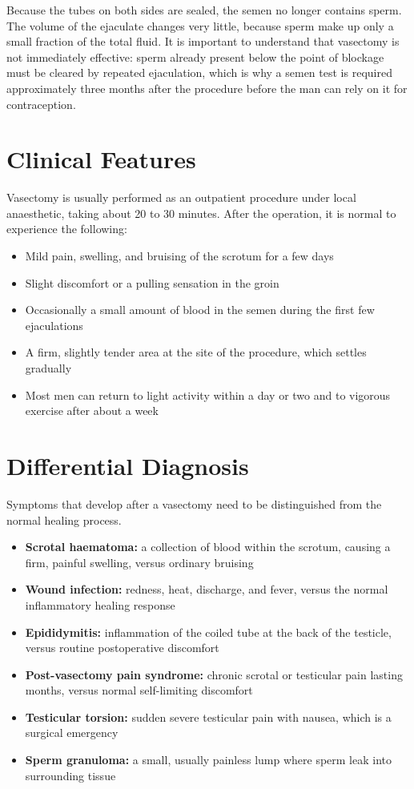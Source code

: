 Because the tubes on both sides are sealed, the semen no longer contains sperm. The volume of the ejaculate changes very little, because sperm make up only a small fraction of the total fluid. It is important to understand that vasectomy is not immediately effective: sperm already present below the point of blockage must be cleared by repeated ejaculation, which is why a semen test is required approximately three months after the procedure before the man can rely on it for contraception.

\section*{Clinical Features}
Vasectomy is usually performed as an outpatient procedure under local anaesthetic, taking about 20 to 30 minutes. After the operation, it is normal to experience the following:

\begin{itemize}
    \item Mild pain, swelling, and bruising of the scrotum for a few days
    \item Slight discomfort or a pulling sensation in the groin
    \item Occasionally a small amount of blood in the semen during the first few ejaculations
    \item A firm, slightly tender area at the site of the procedure, which settles gradually
    \item Most men can return to light activity within a day or two and to vigorous exercise after about a week
\end{itemize}

\section*{Differential Diagnosis}
Symptoms that develop after a vasectomy need to be distinguished from the normal healing process.

\begin{itemize}
    \item \textbf{Scrotal haematoma:} a collection of blood within the scrotum, causing a firm, painful swelling, versus ordinary bruising
    \item \textbf{Wound infection:} redness, heat, discharge, and fever, versus the normal inflammatory healing response
    \item \textbf{Epididymitis:} inflammation of the coiled tube at the back of the testicle, versus routine postoperative discomfort
    \item \textbf{Post-vasectomy pain syndrome:} chronic scrotal or testicular pain lasting months, versus normal self-limiting discomfort
    \item \textbf{Testicular torsion:} sudden severe testicular pain with nausea, which is a surgical emergency
    \item \textbf{Sperm granuloma:} a small, usually painless lump where sperm leak into surrounding tissue
\end{itemize}

